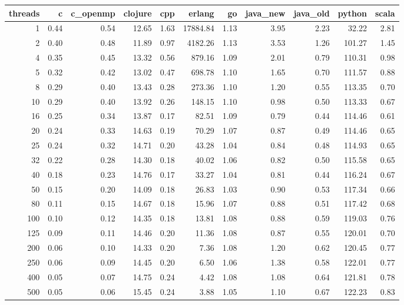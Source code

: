 \begin{table}[ht]
\centering
\begin{tabular}{rrrrrrrrrrr}
  \hline
threads & c & c\_openmp & clojure & cpp & erlang & go & java\_new & java\_old & python & scala \\ 
  \hline
  1 & 0.44 & 0.54 & 12.65 & 1.63 & 17884.84 & 1.13 & 3.95 & 2.23 & 32.22 & 2.81 \\ 
    2 & 0.40 & 0.48 & 11.89 & 0.97 & 4182.26 & 1.13 & 3.53 & 1.26 & 101.27 & 1.45 \\ 
    4 & 0.35 & 0.45 & 13.32 & 0.56 & 879.16 & 1.09 & 2.01 & 0.79 & 110.31 & 0.98 \\ 
    5 & 0.32 & 0.42 & 13.02 & 0.47 & 698.78 & 1.10 & 1.65 & 0.70 & 111.57 & 0.88 \\ 
    8 & 0.29 & 0.40 & 13.43 & 0.28 & 273.36 & 1.10 & 1.20 & 0.55 & 113.35 & 0.70 \\ 
   10 & 0.29 & 0.40 & 13.92 & 0.26 & 148.15 & 1.10 & 0.98 & 0.50 & 113.33 & 0.67 \\ 
   16 & 0.25 & 0.34 & 13.87 & 0.17 & 82.51 & 1.09 & 0.79 & 0.44 & 114.46 & 0.61 \\ 
   20 & 0.24 & 0.33 & 14.63 & 0.19 & 70.29 & 1.07 & 0.87 & 0.49 & 114.46 & 0.65 \\ 
   25 & 0.24 & 0.32 & 14.71 & 0.20 & 43.28 & 1.04 & 0.84 & 0.48 & 114.93 & 0.65 \\ 
   32 & 0.22 & 0.28 & 14.30 & 0.18 & 40.02 & 1.06 & 0.82 & 0.50 & 115.58 & 0.65 \\ 
   40 & 0.18 & 0.23 & 14.76 & 0.17 & 33.27 & 1.04 & 0.81 & 0.44 & 116.24 & 0.67 \\ 
   50 & 0.15 & 0.20 & 14.09 & 0.18 & 26.83 & 1.03 & 0.90 & 0.53 & 117.34 & 0.66 \\ 
   80 & 0.11 & 0.15 & 14.67 & 0.18 & 15.96 & 1.07 & 0.88 & 0.51 & 117.42 & 0.68 \\ 
  100 & 0.10 & 0.12 & 14.35 & 0.18 & 13.81 & 1.08 & 0.88 & 0.59 & 119.03 & 0.76 \\ 
  125 & 0.09 & 0.11 & 14.46 & 0.20 & 11.36 & 1.08 & 0.87 & 0.55 & 120.01 & 0.70 \\ 
  200 & 0.06 & 0.10 & 14.33 & 0.20 & 7.36 & 1.08 & 1.20 & 0.62 & 120.45 & 0.77 \\ 
  250 & 0.06 & 0.09 & 14.45 & 0.20 & 6.50 & 1.06 & 1.38 & 0.58 & 122.01 & 0.77 \\ 
  400 & 0.05 & 0.07 & 14.75 & 0.24 & 4.42 & 1.08 & 1.08 & 0.64 & 121.81 & 0.78 \\ 
  500 & 0.05 & 0.06 & 15.45 & 0.24 & 3.88 & 1.05 & 1.10 & 0.67 & 122.23 & 0.83 \\ 
   \hline
\end{tabular}
\end{table}

